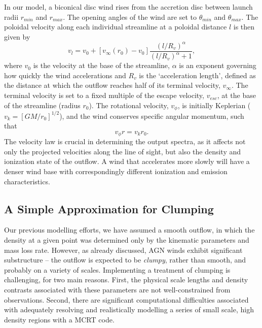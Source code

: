 \documentclass[useAMS,usenatbib]{mn2e_x}
\begin{document}
In our model, a biconical disc wind rises from the accretion 
disc between launch radii $r_{min}$ and $r_{max}$.
The opening angles of the wind are set to $\theta_{min}$ and $\theta_{max}$.
The poloidal velocity along each individual streamline at a poloidal distance $l$ 
is then given by
\begin{equation}
v_l=v_0+\left[v_{\infty}(r_0)-v_0\right]\frac{\left(l/R_v\right)^{\alpha}}{\left(l/R_v\right)^{\alpha}+1},
\label{v_law}
\end{equation}
where $v_0$ is the velocity at the base of the streamline, $\alpha$ is
an exponent governing how quickly the wind accelerations and 
$R_v$ is the `acceleration length', defined as the distance at which
the outflow reaches half of its terminal velocity, $v_{\infty}$.
The terminal velocity is set to a fixed multiple of the escape
velocity, $v_{esc}$, at the base of the streamline (radius $r_0$).
The rotational velocity, $v_{\phi}$, is initially Keplerian ($v_k = [GM/r_0]^{1/2}$),
and the wind conserves specific angular momentum, such that 
\begin{equation}
v_{\phi} r = v_k r_0.
\label{v_law}
\end{equation}
The velocity law is crucial in determining the output spectra,
as it affects not only the projected velocities along the line of sight,
but also the density and ionization state of the outflow.
A wind that accelerates more slowly will have a denser wind base
with correspondingly different ionization and emission characteristics.

\subsection{A Simple Approximation for Clumping}

Our previous modelling efforts, we have assumed a smooth outflow, 
in which the density at a given point was determined only by the 
kinematic parameters and mass loss rate. However, as already discussed,
AGN winds exhibit significant substructure -- the outflow is expected to be
{\em clumpy}, rather than smooth, and probably on a variety of scales. 
Implementing a treatment of clumping is challenging, for
two main reasons. First, the physical scale lengths and density contrasts 
associated with these parameters are not well-constrained from observations.  
Second, there are significant computational difficulties associated with adequately
resolving and realistically modelling a series of small scale, high density
regions with a MCRT code. 
\end{document}
